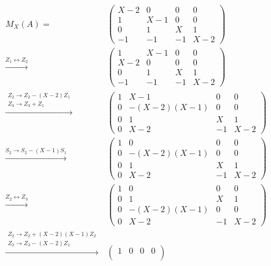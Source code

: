 \begin{align*}
    M_X(A)
  =&\,
    \begin{pmatrix}
      X-2 &   0 &   0 &   0 \\
        1 & X-1 &   0 &   0 \\
        0 &   1 & X   &   1 \\
       -1 &  -1 &  -1 & X-2
    \end{pmatrix}
  \\
  \xrightarrow{Z_1 \leftrightarrow Z_2}&\,
    \begin{pmatrix}
        1 & X-1 &   0 &   0 \\
      X-2 &   0 &   0 &   0 \\
        0 &   1 & X   &   1 \\
       -1 &  -1 &  -1 & X-2
    \end{pmatrix}
  \\
  \xrightarrow{\substack{Z_2 \to Z_2 - (X-2) Z_1 \\ Z_3 \to Z_3 + Z_1}}&\,
    \begin{pmatrix}
      1 &         X-1 &   0 &   0 \\
      0 & -(X-2)(X-1) &   0 &   0 \\
      0 &           1 & X   &   1 \\
      0 &         X-2 &  -1 & X-2
    \end{pmatrix}
  \\
  \xrightarrow{S_2 \to S_2 - (X-1) S_1}&\,
    \begin{pmatrix}
      1 &           0 &   0 &   0 \\
      0 & -(X-2)(X-1) &   0 &   0 \\
      0 &           1 & X   &   1 \\
      0 &         X-2 &  -1 & X-2
    \end{pmatrix}
  \\
  \xrightarrow{Z_2 \leftrightarrow Z_3}&\,
    \begin{pmatrix}
      1 &           0 &   0 &   0 \\
      0 &           1 & X   &   1 \\
      0 & -(X-2)(X-1) &   0 &   0 \\
      0 &         X-2 &  -1 & X-2
    \end{pmatrix}
  \\
  \xrightarrow{\substack{Z_2 \to Z_2 + (X-2)(X-1)Z_2 \\ Z_3 \to Z_3 - (X-2) Z_1}}&\,
    \begin{pmatrix}
      1 & 0 &           0 &          0  \\

\end{pmatrix}
\end{align*}
